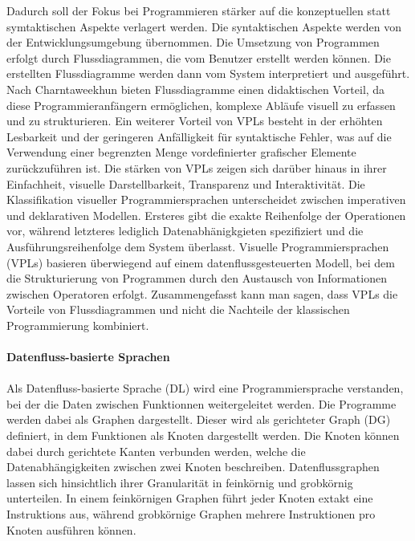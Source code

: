 \documentclass{article}
\begin{document}
    Dadurch soll der Fokus bei Programmieren stärker auf die konzeptuellen statt symtaktischen Aspekte verlagert werden. Die syntaktischen Aspekte werden von der Entwicklungsumgebung übernommen. \cite{10}
    Die Umsetzung von Programmen erfolgt durch Flussdiagrammen, die vom Benutzer erstellt werden können. 
    Die erstellten Flussdiagramme werden dann vom System interpretiert und ausgeführt. \cite{12}
    Nach Charntaweekhun bieten Flussdiagramme einen didaktischen Vorteil, da diese Programmieranfängern ermöglichen, komplexe Abläufe visuell zu erfassen und zu strukturieren. \cite{12}
    Ein weiterer Vorteil von VPLs besteht in der erhöhten Lesbarkeit und der geringeren Anfälligkeit für syntaktische Fehler, was auf die Verwendung einer begrenzten Menge vordefinierter grafischer Elemente zurückzuführen ist.\cite{10}
    Die stärken von VPLs zeigen sich darüber hinaus in ihrer Einfachheit, visuelle Darstellbarkeit, Transparenz und Interaktivität. \cite{13}
    Die Klassifikation visueller Programmiersprachen unterscheidet zwischen imperativen und deklarativen Modellen. Ersteres gibt die exakte Reihenfolge der Operationen vor, während letzteres lediglich Datenabhänigkgieten spezifiziert und die Ausführungsreihenfolge dem System überlasst.\cite{21}
    Visuelle Programmiersprachen (VPLs) basieren überwiegend auf einem datenflussgesteuerten Modell, bei dem die Strukturierung von Programmen durch den Austausch von Informationen zwischen Operatoren erfolgt. \cite{6}
    Zusammengefasst kann man sagen, dass VPLs die Vorteile von Flussdiagrammen und nicht die Nachteile der klassischen Programmierung kombiniert. \cite{13}\\
    \\
    \textbf{Datenfluss-basierte Sprachen}\\
    \\
    Als Datenfluss-basierte Sprache (DL) wird eine Programmiersprache verstanden, bei der die Daten zwischen Funktionnen weitergeleitet werden. 
    Die Programme werden dabei als Graphen dargestellt. \cite{11}
    Dieser wird als gerichteter Graph (DG) definiert, in dem Funktionen als Knoten dargestellt werden.
    Die Knoten können dabei durch gerichtete Kanten verbunden werden, welche die Datenabhängigkeiten zwischen zwei Knoten beschreiben. \cite{2}
    Datenflussgraphen lassen sich hinsichtlich ihrer Granularität in feinkörnig und grobkörnig unterteilen. In einem feinkörnigen Graphen führt jeder Knoten extakt eine Instruktions aus, während grobkörnige Graphen mehrere Instruktionen pro Knoten ausführen können.\cite{1}
\end{document}
